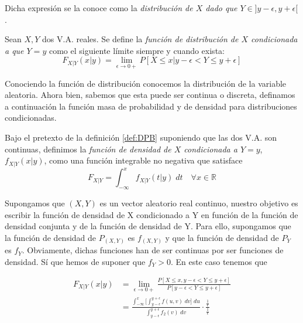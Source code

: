     Dicha expresión se la conoce como la \textit{distribución de $X$ dado que $Y \in ]y - \epsilon, y + \epsilon [$}.
    
    \begin{definicion} \label{def:DPB}
    Sean $X,Y$ dos V.A. reales. Se define la \textit{función de distribución de $X$ condicionada a que $Y=y$} como el siguiente límite siempre y cuando exista:
    \begin{equation}\label{eq:limitProbCond}
    F_{X|Y}(x|y) = \lim_{\epsilon \to 0+}P[X \leq x | y - \epsilon < Y \leq y + \epsilon]
    \end{equation}
    \end{definicion}
    
    Conociendo la función de distribución conocemos la distribución de la variable aleatoria. Ahora bien, sabemos que esta puede ser continua o discreta, definamos a continuación la función masa de probabilidad y de densidad para distribuciones condicionadas. \\
    
    \begin{definicion}
    
        Bajo el pretexto de la definición \ref{def:DPB} suponiendo que las dos V.A. son continuas, definimos la \textit{función de densidad de $X$ condicionada a $Y=y$}, $f_{X|Y}(x|y)$, como una función integrable no negativa que satisface
        $$F_{X|Y} = \int_{-\infty}^x f_{X|Y}(t|y) \;dt \quad \forall x \in \mathbb{R} $$
    
    \end{definicion}    
    
    Supongamos que $(X,Y)$ es un vector aleatorio real continuo, nuestro objetivo es escribir la función de densidad de X condicionado a Y en función de la función de densidad conjunta y de la función de densidad de Y. Para ello, supongamos que la función de densidad de $P_{(X,Y)}$ es $f_{(X,Y)}$ y que la función de densidad de $P_Y$ es $f_Y$. Obviamente, dichas funciones han de ser continuas por ser funciones de densidad. Sí que hemos de suponer que $f_Y > 0$. En este caso tenemos que 
    
    \begin{equation}
        \begin{aligned}
            F_{X|Y}(x|y) & = \lim_{\epsilon \to 0+} \frac{P[X \leq x , y - \epsilon < Y \leq y + \epsilon]}{P[y-\epsilon < Y \leq y+\epsilon]}\\
            & = \frac{\int_{-\infty}^x \Big[ \int_{y - \epsilon}^{y + \epsilon}f(u,v) \; dv \Big] \; du}{\int_{y - \epsilon}^{y + \epsilon} f_2(v) \; dv} \cdot \frac{\frac{1}{ \epsilon}}{\frac{1}{\epsilon}}
        \end{aligned}
    \end{equation}
    
